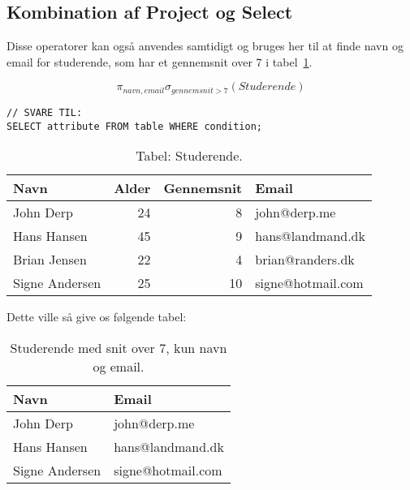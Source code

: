 \subsection{Kombination af Project og Select}

Disse operatorer kan også anvendes samtidigt og bruges her til at finde navn og email for studerende, som har et gennemsnit over 7 i tabel~\ref{tab:stud}.

\begin{equation*}
\pi_{navn, email}\sigma_{gennemsnit>7}(Studerende)
\end{equation*}

\begin{lstlisting}[morekeywords={SELECT, FROM, WHERE}]
// SVARE TIL:
SELECT attribute FROM table WHERE condition;
\end{lstlisting}

\begin{table}[H]
	\centering
	\begin{tabular}{lrrl}
		\toprule
		\textbf{Navn}	&\textbf{Alder}	&\textbf{Gennemsnit}&\textbf{Email}\\
		\midrule
		John Derp		& 24 			& 8	& john@derp.me			\\			
		Hans Hansen		& 45 			& 9	& hans@landmand.dk		\\			
		Brian Jensen	& 22 			& 4	& brian@randers.dk		\\			
		Signe Andersen	& 25 			& 10	& signe@hotmail.com		\\
		\bottomrule
	\end{tabular}
	\caption{Tabel: Studerende.}
	\label{tab:stud}
\end{table}

Dette ville så give os følgende tabel:

\begin{table}[H]
	\centering
	\begin{tabular}{ll}
		\toprule
		\textbf{Navn}	& \textbf{Email}	\\
		\midrule
		John Derp		& john@derp.me		\\			
		Hans Hansen		& hans@landmand.dk	\\			
		Signe Andersen	& signe@hotmail.com	\\
		\bottomrule
	\end{tabular}
	\caption{Studerende med snit over 7, kun navn og email.}
\end{table}